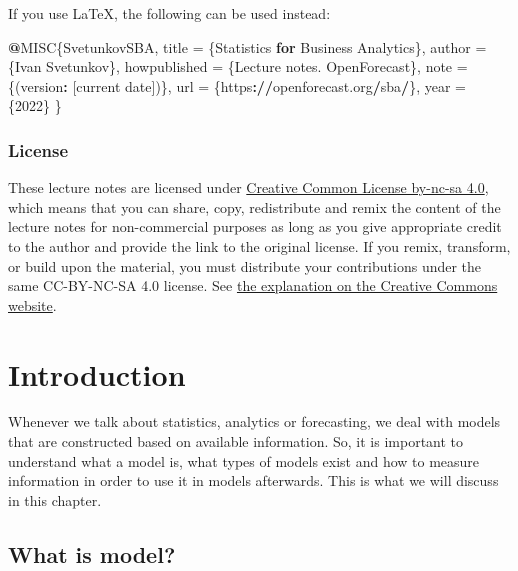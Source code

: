 \documentclass[
]{book}
\newenvironment{Shaded}{\begin{snugshade}}{\end{snugshade}}
\newcommand{\ControlFlowTok}[1]{\textcolor[rgb]{0.13,0.29,0.53}{\textbf{#1}}}
\newcommand{\DecValTok}[1]{\textcolor[rgb]{0.00,0.00,0.81}{#1}}
\newcommand{\ErrorTok}[1]{\textcolor[rgb]{0.64,0.00,0.00}{\textbf{#1}}}
\newcommand{\NormalTok}[1]{#1}
\newcommand{\OtherTok}[1]{\textcolor[rgb]{0.56,0.35,0.01}{#1}}
\newcommand{\SpecialCharTok}[1]{\textcolor[rgb]{0.81,0.36,0.00}{\textbf{#1}}}
\theoremstyle{definition}
\theoremstyle{definition}
\theoremstyle{definition}
\theoremstyle{definition}
\theoremstyle{remark}
\begin{document}
If you use LaTeX, the following can be used instead:

\begin{Shaded}
\begin{Highlighting}[]
\SpecialCharTok{@}\NormalTok{MISC\{SvetunkovSBA,}
\NormalTok{    title }\OtherTok{=}\NormalTok{ \{Statistics }\ControlFlowTok{for}\NormalTok{ Business Analytics\},}
\NormalTok{    author }\OtherTok{=}\NormalTok{ \{Ivan Svetunkov\},}
\NormalTok{    howpublished }\OtherTok{=}\NormalTok{ \{Lecture notes. OpenForecast\},}
\NormalTok{    note }\OtherTok{=}\NormalTok{ \{(version}\SpecialCharTok{:}\NormalTok{ [current date])\},}
\NormalTok{    url }\OtherTok{=}\NormalTok{ \{https}\SpecialCharTok{:}\ErrorTok{//}\NormalTok{openforecast.org}\SpecialCharTok{/}\NormalTok{sba}\SpecialCharTok{/}\NormalTok{\},}
\NormalTok{    year }\OtherTok{=}\NormalTok{ \{}\DecValTok{2022}\NormalTok{\}}
\NormalTok{\}}
\end{Highlighting}
\end{Shaded}

\subsection*{License}\label{license}

These lecture notes are licensed under \href{https://creativecommons.org/licenses/by-nc-sa/4.0/}{Creative Common License by-nc-sa 4.0}, which means that you can share, copy, redistribute and remix the content of the lecture notes for non-commercial purposes as long as you give appropriate credit to the author and provide the link to the original license. If you remix, transform, or build upon the material, you must distribute your contributions under the same CC-BY-NC-SA 4.0 license. See \href{https://creativecommons.org/licenses/by-nc-sa/4.0/}{the explanation on the Creative Commons website}.

\chapter{Introduction}\label{intro}

Whenever we talk about statistics, analytics or forecasting, we deal with models that are constructed based on available information. So, it is important to understand what a model is, what types of models exist and how to measure information in order to use it in models afterwards. This is what we will discuss in this chapter.

\section{What is model?}\label{what-is-model}
\end{document}
